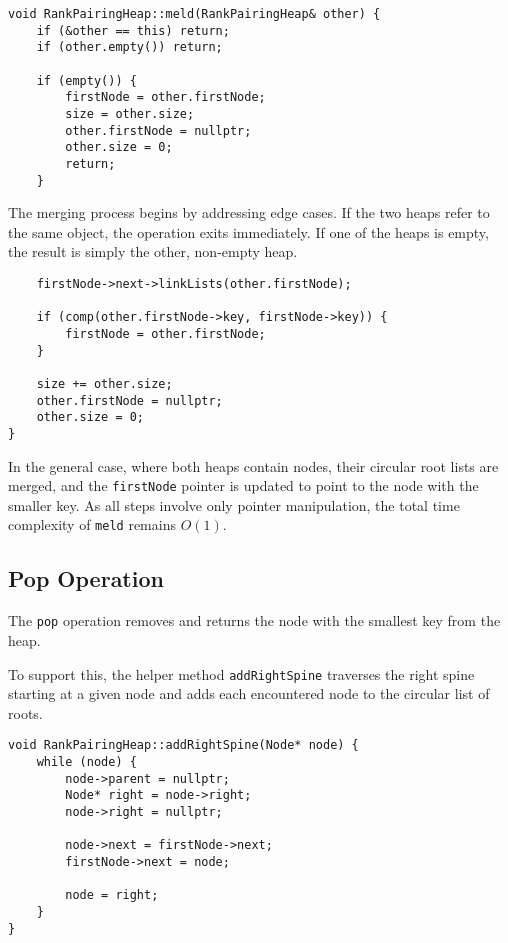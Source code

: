 \begin{verbatim}
void RankPairingHeap::meld(RankPairingHeap& other) {
    if (&other == this) return;
    if (other.empty()) return;

    if (empty()) {
        firstNode = other.firstNode;
        size = other.size;
        other.firstNode = nullptr;
        other.size = 0;
        return;
    }
\end{verbatim}

The merging process begins by addressing edge cases. If the two heaps refer to the same object, the operation exits immediately. If one of the heaps is empty, the result is simply the other, non-empty heap.

\begin{verbatim}
    firstNode->next->linkLists(other.firstNode);

    if (comp(other.firstNode->key, firstNode->key)) {
        firstNode = other.firstNode;
    }

    size += other.size;
    other.firstNode = nullptr;
    other.size = 0;
}
\end{verbatim}

In the general case, where both heaps contain nodes, their circular root lists are merged, and the \texttt{firstNode} pointer is updated to point to the node with the smaller key. As all steps involve only pointer manipulation, the total time complexity of \texttt{meld} remains \(O(1)\).

\subsection{Pop Operation}

The \texttt{pop} operation removes and returns the node with the smallest key from the heap.

To support this, the helper method \texttt{addRightSpine} traverses the right spine starting at a given node and adds each encountered node to the circular list of roots.

\begin{verbatim}
void RankPairingHeap::addRightSpine(Node* node) {
    while (node) {
        node->parent = nullptr;
        Node* right = node->right;
        node->right = nullptr;
        
        node->next = firstNode->next;
        firstNode->next = node;
        
        node = right;
    }
}
\end{verbatim}

